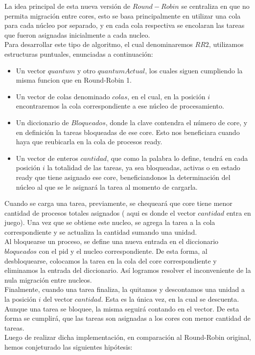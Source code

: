 La idea principal de esta nueva versión de $Round-Robin$ se centraliza en que no permita migración entre
cores, esto se basa principalmente en utilizar una cola para cada núcleo por separado, y en cada
cola respectiva se encolaran las tareas que fueron asignadas inicialmente a cada nucleo.\\
Para desarrollar este tipo de algoritmo, el cual denominaremos $RR2$, utilizamos estructuras
puntuales, enunciadas a continuación:\\
\begin{itemize}
 \item Un vector $quantum$ y otro $quantumActual$, los cuales siguen cumpliendo la misma funcion que
 en Round-Robin 1.
 \item Un vector de colas denominado $colas$, en el cual, en la posición $i$ encontraremos la cola correspondiente
 a ese núcleo de procesamiento.
 \item Un diccionario de $Bloqueados$, donde la clave contendra el número de core, y en definición
 la tareas bloqueadas de ese core. Esto nos beneficiara cuando haya que reubicarla en la cola de procesos ready.
 \item Un vector de enteros $cantidad$, que como la palabra lo define, tendrá en cada posición $i$ 
 la totalidad de las tareas, ya sea bloqueadas, activas o en estado ready que tiene asignado ese core, beneficiandonos
 la determinación del núcleo al que se le asignará la tarea al momento de cargarla.
\end{itemize}
Cuando se carga una tarea, previamente, se chequeará que core tiene menor cantidad de procesos totales asignados (
aqui es donde el vector $cantidad$ entra en juego). Una vez que se obtiene este nucleo, se agrega 
la tarea a la cola correspondiente y se actualiza la cantidad sumando una unidad.\\
\indent Al bloquearse un proceso, se define una nueva entrada en el diccionario $bloqueados$ con el
pid y el nucleo correspondiente. De esta forma, al desbloquearse, colocamos la tarea en la cola del core
correspondiente y eliminamos la entrada del diccionario. Así logramos resolver el inconveniente de la nula
migración entre nucleos.\\
\indent Finalmente, cuando una tarea finaliza, la quitamos y descontamos una unidad a la posición $i$ del vector
$cantidad$. Esta es la única vez, en la cual se descuenta. Aunque una tarea se bloquee, la misma
seguirá contando en el vector. De esta forma se cumplirá, que las tareas son asignadas a los cores
con menor cantidad de tareas.\\
Luego de realizar dicha implementación, en comparación al Round-Robin original, hemos conjeturado 
las siguientes hipótesis:

